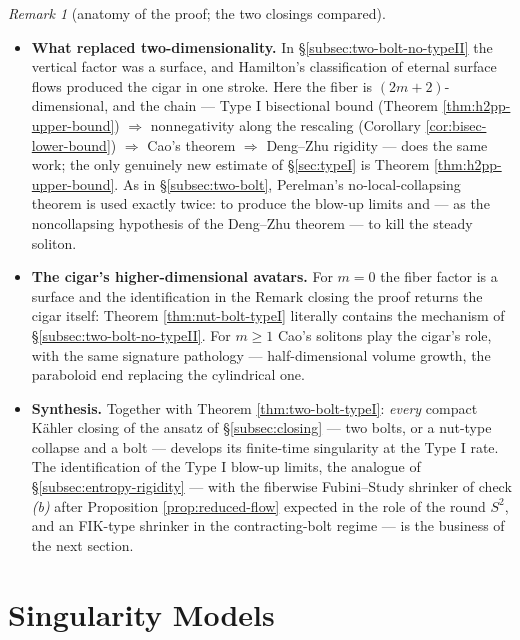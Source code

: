 \documentclass[11pt]{amsart}
\theoremstyle{plain}
\numberwithin{equation}{section}
\theoremstyle{definition}
\theoremstyle{remark}
\newtheorem*{remarkx}{Remark}
\begin{document}
\begin{remarkx}[anatomy of the proof; the two closings compared]
	\begin{itemize}
		\item \textbf{What replaced two-dimensionality.} In \S\ref{subsec:two-bolt-no-typeII} the vertical factor was a surface, and Hamilton's classification of eternal surface flows produced the cigar in one stroke. Here the fiber is $( 2 m + 2 )$-dimensional, and the chain --- Type I bisectional bound (Theorem \ref{thm:h2pp-upper-bound}) $\Rightarrow$ nonnegativity along the rescaling (Corollary \ref{cor:bisec-lower-bound}) $\Rightarrow$ Cao's theorem $\Rightarrow$ Deng--Zhu rigidity --- does the same work; the only genuinely new estimate of \S\ref{sec:typeI} is Theorem \ref{thm:h2pp-upper-bound}. As in \S\ref{subsec:two-bolt}, Perelman's no-local-collapsing theorem is used exactly twice: to produce the blow-up limits and --- as the noncollapsing hypothesis of the Deng--Zhu theorem --- to kill the steady soliton.
		\item \textbf{The cigar's higher-dimensional avatars.} For $m = 0$ the fiber factor is a surface and the identification in the Remark closing the proof returns the cigar itself: Theorem \ref{thm:nut-bolt-typeI} literally contains the mechanism of \S\ref{subsec:two-bolt-no-typeII}. For $m \geq 1$ Cao's solitons play the cigar's role, with the same signature pathology --- half-dimensional volume growth, the paraboloid end replacing the cylindrical one.
		\item \textbf{Synthesis.} Together with Theorem \ref{thm:two-bolt-typeI}: \emph{every} compact Kähler closing of the ansatz of \S\ref{subsec:closing} --- two bolts, or a nut-type collapse and a bolt --- develops its finite-time singularity at the Type I rate. The identification of the Type I blow-up limits, the analogue of \S\ref{subsec:entropy-rigidity} --- with the fiberwise Fubini--Study shrinker of check \emph{(b)} after Proposition \ref{prop:reduced-flow} expected in the role of the round $S^2$, and an FIK-type shrinker in the contracting-bolt regime --- is the business of the next section.
	\end{itemize}
	
\end{remarkx}
\fi

\section{Singularity Models}\label{sec:limits}
\end{document}
